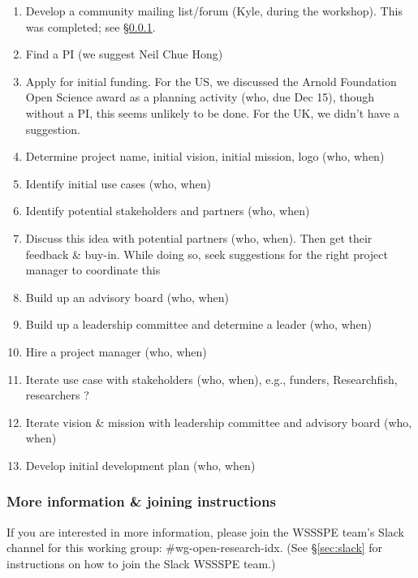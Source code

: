 \begin{enumerate}
\item Develop a community mailing list/forum (Kyle, during the workshop).  This was completed; see \S\ref{sec:wg-open-research-index-list}.

\item Find a PI (we suggest Neil Chue Hong)

\item Apply for initial funding. For the US, we discussed the Arnold Foundation Open Science award as a planning activity (who, due Dec 15), though without a PI, this seems unlikely to be done.
For the UK, we didn't have a suggestion.

\item Determine project name, initial vision, initial mission, logo (who, when)

\item Identify initial use cases (who, when)

\item Identify potential stakeholders and partners (who, when)

\item Discuss this idea with potential partners (who, when).
Then get their feedback \& buy-in.
While doing so, seek suggestions for the right project manager to coordinate this

\item Build up an advisory board (who, when)

\item Build up a leadership committee and determine a leader (who, when)

\item Hire a project manager (who, when)

\item Iterate use case with stakeholders (who, when),
e.g., funders, Researchfish, researchers ?

\item Iterate vision \& mission with leadership committee and advisory board (who, when)

\item Develop initial development plan (who, when)

\end{enumerate}


\subsubsection{More information \& joining instructions}\label{sec:wg-open-research-index-list}

If you are interested in more information, please join the WSSSPE team's Slack channel for this working group: \#wg-open-research-idx.  (See \S\ref{sec:slack} for instructions on how to join the Slack WSSSPE team.)
